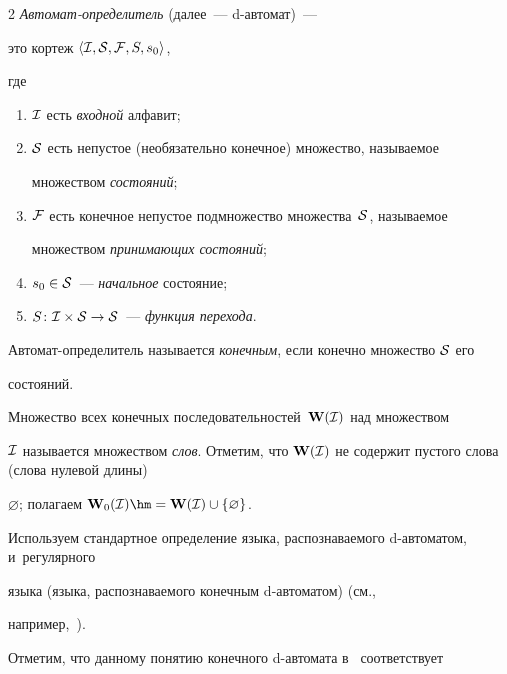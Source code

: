\begin{multicols}{2}
\textit{Автомат-определитель} (далее~--- d-ав\-то\-мат)~--- 


это кортеж $\langle\mathcal I,\mathcal S,\mathcal F,S,s_0\rangle$,


где


\begin{enumerate}[(1)]


\item $\mathcal I$  есть  \textit{входной} алфавит;


\item $\mathcal S$ есть непустое (необязательно конечное) множество, называемое


множеством \textit{со\-сто\-яний};


\item $\mathcal F$ есть конечное непустое подмножество множества~$\mathcal S$, называемое


множеством \textit{при\-ни\-ма\-ющих со\-сто\-яний};


\item $s_0\in\mathcal S$~--- \textit{начальное} со\-сто\-яние;


\item $S\colon \mathcal I\times\mathcal S\to \mathcal S$~--- \textit{функция перехода}.


\end{enumerate}


Автомат-определитель называется \textit{конечным}, если конечно множество $\mathcal S$ его


состояний.





\smallskip





Множество  всех конечных последовательностей~$\mathbf W(\mathcal I)$ над множеством


$\mathcal I$ называется множеством \textit{слов}. Отметим, что $\mathbf W(\mathcal I)$ не содержит пустого слова (слова нулевой длины)


$\varnothing$; полагаем $\mathbf W_0(\Cal I)\hm=\mathbf W(\Cal I)\cup \{\varnothing\}$.


Используем стандартное определение языка, распознаваемого d-ав\-то\-ма\-том, и~регулярного


языка (языка, распознаваемого конечным d-ав\-то\-ма\-том) (см., 


например,~\cite{Allouche-Shall}).


Отметим, что данному понятию конечного d-ав\-то\-ма\-та в~\cite{Allouche-Shall} соответствует



\end{multicols}

